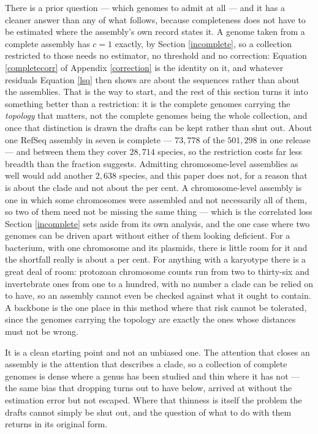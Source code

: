 \documentclass[pdflatex,sn-vancouver-num]{sn-jnl}
\begin{document}
There is a prior question --- which genomes to admit at all --- and it has a cleaner answer than any
of what follows, because completeness does not have to be estimated where the assembly's own record
states it. A genome taken from a complete assembly has $c = 1$ exactly, by Section \ref{incomplete},
so a collection restricted to those needs no estimator, no threshold and no correction:
Equation \eqref{completecorr} of Appendix \ref{correction} is the identity on it, and whatever residuals Equation \eqref{lsq} then
shows are about the sequences rather than about the assemblies. That is the way to start, and the rest of this section turns
it into something better than a restriction: it is the complete genomes carrying the \emph{topology}
that matters, not the complete genomes being the whole collection, and once that distinction is drawn
the drafts can be kept rather than shut out. About one
RefSeq assembly in seven is complete --- $73{,}778$ of the $501{,}298$ in one release --- and between
them they cover $28{,}714$ species, so the restriction costs far less breadth than the fraction
suggests. Admitting chromosome-level assemblies as well would add another $2{,}638$ species, and
this paper does not, for a reason that is about the clade and not about the per cent. A
chromosome-level assembly is one in which some chromosomes were assembled and not necessarily all of
them, so two of them need not be missing the same thing --- which is the correlated loss
Section \ref{incomplete} sets aside from its own analysis, and the one case where two genomes can be
driven apart without either of them looking deficient. For a bacterium, with one chromosome and its
plasmids, there is little room for it and the shortfall really is about a per cent. For anything with
a karyotype there is a great deal of room: protozoan chromosome counts run from two to thirty-six and
invertebrate ones from one to a hundred, with no number a clade can be relied on to have, so an
assembly cannot even be checked against what it ought to contain. A backbone is the one place in this
method where that risk cannot be tolerated, since the genomes carrying the topology are exactly the
ones whose distances must not be wrong.

It is a clean starting point and not an unbiased one. The attention that closes an assembly is the
attention that describes a clade, so a collection of complete genomes is dense where a genus has been
studied and thin where it has not --- the same bias that dropping turns out to have below, arrived at
without the estimation error but not escaped. Where that thinness is itself the problem the drafts
cannot simply be shut out, and the question of what to do with them returns in its original form.
\end{document}
